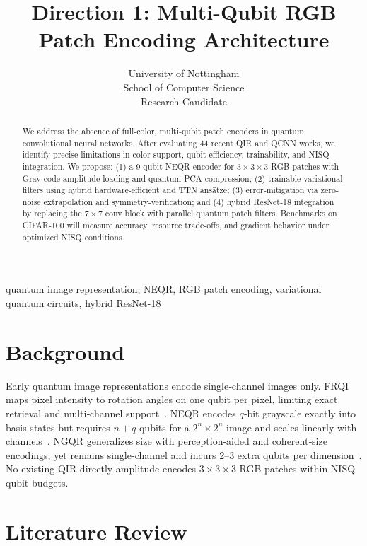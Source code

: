 \documentclass[onecolumn,12pt]{IEEEtran}
\begin{document}
\title{Direction 1: Multi-Qubit RGB Patch Encoding Architecture}
\author{
University of Nottingham\\
School of Computer Science\\
\small{Research Candidate}
}
\maketitle

\begin{abstract}
We address the absence of full‐color, multi‐qubit patch encoders in quantum convolutional neural networks. After evaluating 44 recent QIR and QCNN works, we identify precise limitations in color support, qubit efficiency, trainability, and NISQ integration. We propose: (1) a 9‐qubit NEQR encoder for $3\times3\times3$ RGB patches with Gray‐code amplitude‐loading and quantum‐PCA compression; (2) trainable variational filters using hybrid hardware‐efficient and TTN ansätze; (3) error‐mitigation via zero‐noise extrapolation and symmetry‐verification; and (4) hybrid ResNet‐18 integration by replacing the $7\times7$ conv block with parallel quantum patch filters. Benchmarks on CIFAR‐100 will measure accuracy, resource trade‐offs, and gradient behavior under optimized NISQ conditions.
\end{abstract}

\begin{IEEEkeywords}
quantum image representation, NEQR, RGB patch encoding, variational quantum circuits, hybrid ResNet-18
\end{IEEEkeywords}

\section{Background}
Early quantum image representations encode single‐channel images only. FRQI maps pixel intensity to rotation angles on one qubit per pixel, limiting exact retrieval and multi‐channel support~\cite{le2011frqi}. NEQR encodes $q$‐bit grayscale exactly into basis states but requires $n+q$ qubits for a $2^n\times2^n$ image and scales linearly with channels~\cite{zhang2013neqr}. NGQR generalizes size with perception‐aided and coherent‐size encodings, yet remains single‐channel and incurs 2–3 extra qubits per dimension~\cite{xing2024ngqr}. No existing QIR directly amplitude‐encodes $3\times3\times3$ RGB patches within NISQ qubit budgets.

\section{Literature Review}
\end{document}
